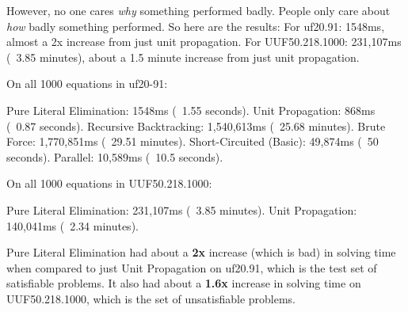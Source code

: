 However, no one cares \textit{why} something performed badly. People only care about 
\textit{how} badly something performed. So here are the results:
For uf20.91: 1548ms, almost a 2x increase from just unit propagation.
For UUF50.218.1000: 231,107ms (~3.85 minutes), about a 1.5 minute increase 
from just unit propagation.

\begin{FVerbatim}
On all 1000 equations in uf20-91:

Pure Literal Elimination:  1548ms (~1.55 seconds).
Unit Propagation:          868ms (~0.87 seconds).
Recursive Backtracking:    1,540,613ms (~25.68 minutes).
Brute Force:               1,770,851ms (~29.51 minutes).
Short-Circuited (Basic):   49,874ms (~50 seconds).
Parallel:                  10,589ms (~10.5 seconds).

On all 1000 equations in UUF50.218.1000:

Pure Literal Elimination: 231,107ms (~3.85 minutes).
Unit Propagation:         140,041ms (~2.34 minutes).
\end{FVerbatim}

Pure Literal Elimination had about a \textbf{2x} increase (which is bad) in solving time
when compared to just Unit Propagation on uf20.91, which is the test set of satisfiable
problems. It also had about a \textbf{1.6x} increase in solving time on UUF50.218.1000,
which is the set of unsatisfiable problems.